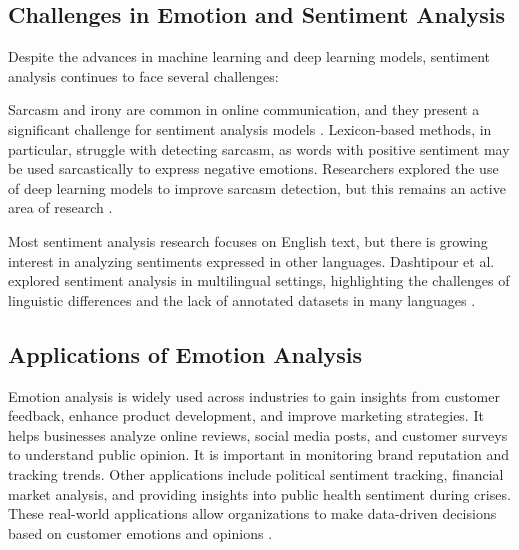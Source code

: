 \subsection{Challenges in Emotion and Sentiment Analysis}

Despite the advances in machine learning and deep learning models, sentiment analysis continues to face several challenges:

Sarcasm and irony are common in online communication, and they present a significant challenge for sentiment analysis models \cite{Meriem2021}. Lexicon-based methods, in particular, struggle with detecting sarcasm, as words with positive sentiment may be used sarcastically to express negative emotions. Researchers explored the use of deep learning models to improve sarcasm detection, but this remains an active area of research \cite{Pozzi2017}.

Most sentiment analysis research focuses on English text, but there is growing interest in analyzing sentiments expressed in other languages. Dashtipour et al. explored sentiment analysis in multilingual settings, highlighting the challenges of linguistic differences and the lack of annotated datasets in many languages \cite{Dashtipour2016}.

\subsection{Applications of Emotion Analysis}

Emotion analysis is widely used across industries to gain insights from customer feedback, enhance product development, and improve marketing strategies. It helps businesses analyze online reviews, social media posts, and customer surveys to understand public opinion. It is important in monitoring brand reputation and tracking trends. Other applications include political sentiment tracking, financial market analysis, and providing insights into public health sentiment during crises. These real-world applications allow organizations to make data-driven decisions based on customer emotions and opinions \cite{nobledesktop2024}.
